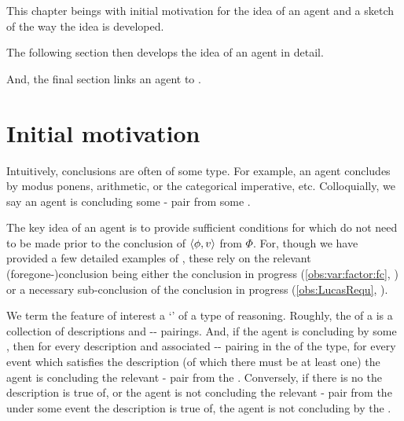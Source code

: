 \begin{note}
  This chapter beings with initial motivation for the idea of an agent  and a sketch of the way the idea is developed.

  The following section then develops the idea of an agent  in detail.

  And, the final section links an agent  to .
\end{note}



\section{Initial motivation}


\begin{note}
  Intuitively, conclusions are often of some type.
  For example, an agent concludes by modus ponens, arithmetic, or the categorical imperative, etc.
  Colloquially, we say an agent is \emph{\typeAdj{}} concluding some - pair from some \pool{}.

  The key idea of an agent \tCV{} is to provide sufficient conditions for  which do not need to be made prior to the \agents{} conclusion of \(\langle\phi, v\rangle\) from \(\Phi\).
  For, though we have provided a few detailed examples of , these rely on the relevant (foregone-)conclusion being either the conclusion in progress (\autoref{obs:var:factor:fc}, ) or a necessary sub-conclusion of the conclusion in progress (\autoref{obs:LucasRequ}, ).
\end{note}


\begin{note}
  We term the feature of interest a `\tpro{}' of a type of reasoning.
  Roughly, the \tpro{} of a \torN{} is a collection of descriptions and -- pairings.
  And, if the agent is concluding by some \torNa{}, then for every description and associated -- pairing in the \tpro{} of the type, for every event which satisfies the description (of which there must be at least one) the agent is concluding the relevant - pair from the .
  Conversely, if there is no \eiw{} the description is true of, or the agent is not concluding the relevant - pair from the  under some event the description is true of, the agent is not concluding by the \torNa{}.
\end{note}

